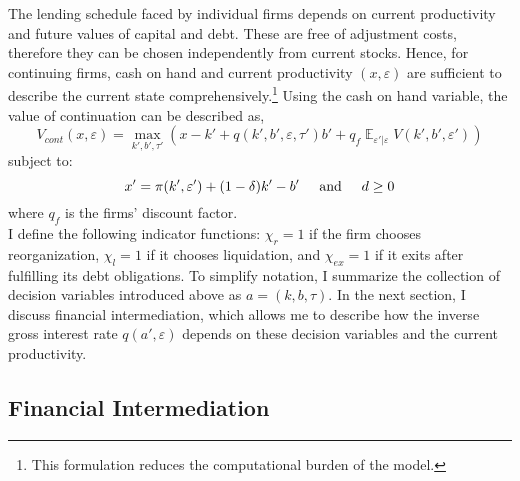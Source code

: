 \documentclass[12pt]{article}
\DeclareMathOperator{\E}{\mathbb{E}}
\begin{document}
The lending schedule faced by individual firms depends on current productivity and future values of capital and debt. These are free of adjustment costs, therefore they can be chosen independently from current stocks. Hence, for continuing firms, cash on hand and current productivity $(x, \varepsilon)$ are sufficient to describe the current state comprehensively.\footnote{This formulation reduces the computational burden of the model.} Using the cash on hand variable, the value of continuation can be described as,
\begin{equation} \label{eq:V_cont}
    V_{cont}(x,\varepsilon) = \max_{k',b', \tau'} \left(x - k' +  q(k',b',\varepsilon, \tau')b' + q_f \E_{\varepsilon'|\varepsilon} V(k',b', \varepsilon') \right)
\end{equation}
subject to: 
\begin{equation} \label{eq:budget}
x' = \pi(k',\varepsilon')+(1-\delta)k'-b' \hspace{5mm} \text{and} \hspace{5mm} d \geq 0
\end{equation} 
where $q_f$ is the firms' discount factor. \vspace{3mm} \\
I define the following indicator functions: $\chi_{r} = 1$ if the firm chooses reorganization, $\chi_l = 1$ if it chooses liquidation, and $\chi_{ex} = 1$ if it exits after fulfilling its debt obligations. To simplify notation, I summarize the collection of decision variables introduced above as $a = (k, b, \tau) $. In the next section, I discuss financial intermediation, which allows me to describe how the inverse gross interest rate $q(a',\varepsilon)$ depends on these decision variables and the current productivity.
\subsection{Financial Intermediation}  \label{sec: Financial Intermediation}
\end{document}
